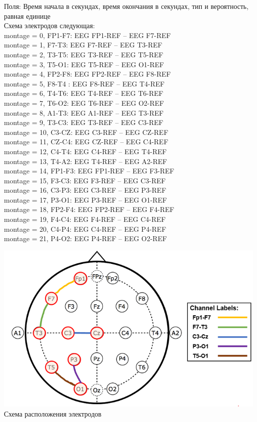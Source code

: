 \documentclass[12pt, a4paper, titlepage]{extreport}
\begin{document}
	Поля: Время начала в секундах, время окончания в секундах, тип и вероятность, равная единице\\
	Схема электродов следующая:\\
	 montage =  0, FP1-F7: EEG FP1-REF --  EEG F7-REF\\
	montage =  1, F7-T3:  EEG F7-REF  --  EEG T3-REF\\
	montage =  2, T3-T5:  EEG T3-REF  --  EEG T5-REF\\
	montage =  3, T5-O1:  EEG T5-REF  --  EEG O1-REF\\
	montage =  4, FP2-F8: EEG FP2-REF --  EEG F8-REF\\
	montage =  5, F8-T4 : EEG F8-REF  --  EEG T4-REF\\
	montage =  6, T4-T6:  EEG T4-REF  --  EEG T6-REF\\
	montage =  7, T6-O2:  EEG T6-REF  --  EEG O2-REF\\
	montage =  8, A1-T3:  EEG A1-REF  --  EEG T3-REF\\
	montage =  9, T3-C3:  EEG T3-REF  --  EEG C3-REF\\
	montage = 10, C3-CZ:  EEG C3-REF  --  EEG CZ-REF\\
	montage = 11, CZ-C4:  EEG CZ-REF  --  EEG C4-REF\\
	montage = 12, C4-T4:  EEG C4-REF  --  EEG T4-REF\\
	montage = 13, T4-A2:  EEG T4-REF  --  EEG A2-REF\\
	montage = 14, FP1-F3: EEG FP1-REF --  EEG F3-REF\\
	montage = 15, F3-C3:  EEG F3-REF  --  EEG C3-REF\\
	montage = 16, C3-P3:  EEG C3-REF  --  EEG P3-REF\\
	montage = 17, P3-O1:  EEG P3-REF  --  EEG O1-REF\\
	montage = 18, FP2-F4: EEG FP2-REF --  EEG F4-REF\\
	montage = 19, F4-C4:  EEG F4-REF  --  EEG C4-REF\\
	montage = 20, C4-P4:  EEG C4-REF  --  EEG P4-REF\\
	montage = 21, P4-O2:  EEG P4-REF  --  EEG O2-REF\\
	\begin{center} 
		\includegraphics[scale=1]{montage_diploma.png}\\
		Схема расположения электродов
	\end{center}
\end{document}
